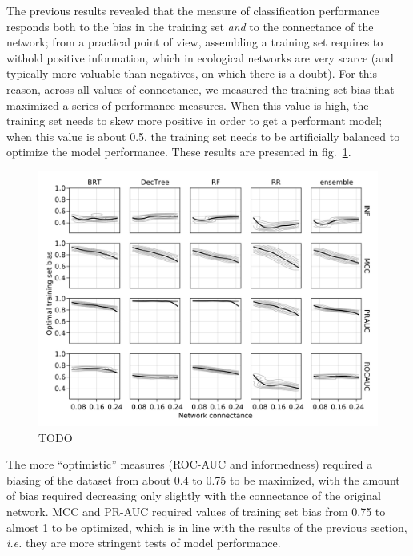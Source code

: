 \documentclass[11pt]{article}
\makeatletter
\def\maxwidth{\ifdim\Gin@nat@width>\linewidth\linewidth
\else\Gin@nat@width\fi}
\let\Oldincludegraphics\includegraphics
\renewcommand{\includegraphics}[1]{\Oldincludegraphics[width=\maxwidth]{#1}}
\makeatother
\begin{document}
The previous results revealed that the measure of classification
performance responds both to the bias in the training set \emph{and} to
the connectance of the network; from a practical point of view,
assembling a training set requires to withold positive information,
which in ecological networks are very scarce (and typically more
valuable than negatives, on which there is a doubt). For this reason,
across all values of connectance, we measured the training set bias that
maximized a series of performance measures. When this value is high, the
training set needs to skew more positive in order to get a performant
model; when this value is about 0.5, the training set needs to be
artificially balanced to optimize the model performance. These results
are presented in fig.~\ref{fig:optimbias}.

\begin{figure}
\hypertarget{fig:optimbias}{%
\centering
\includegraphics{figures/optim_bias.png}
\caption{TODO}\label{fig:optimbias}
}
\end{figure}

The more ``optimistic'' measures (ROC-AUC and informedness) required a
biasing of the dataset from about 0.4 to 0.75 to be maximized, with the
amount of bias required decreasing only slightly with the connectance of
the original network. MCC and PR-AUC required values of training set
bias from 0.75 to almost 1 to be optimized, which is in line with the
results of the previous section, \emph{i.e.} they are more stringent
tests of model performance.
\end{document}
